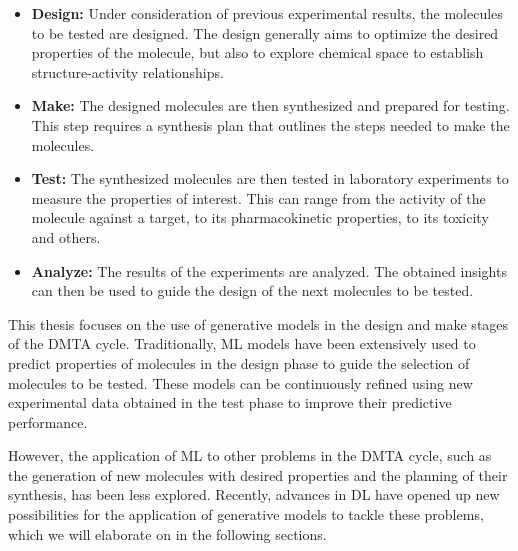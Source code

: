 \begin{itemize}
    \item \textbf{Design:} Under consideration of previous experimental results, the molecules to
          be tested are designed. The design generally aims to optimize the desired properties of
          the molecule, but also to explore chemical space to establish structure-activity relationships.
    \item \textbf{Make:} The designed molecules are then synthesized and prepared for testing. This
          step requires a synthesis plan that outlines the steps needed to make the molecules.
    \item \textbf{Test:} The synthesized molecules are then tested in laboratory experiments to
          measure the properties of interest. This can range from the activity of the molecule
          against a target, to its pharmacokinetic properties, to its toxicity and others.
    \item \textbf{Analyze:} The results of the experiments are analyzed. The obtained insights
          can then be used to guide the design of the next molecules to be tested.
\end{itemize}

This thesis focuses on the use of generative models in the design and make stages of the \ac{DMTA}
cycle. Traditionally, \ac{ML} models have been extensively used to predict properties of molecules
in the design phase to guide the selection of molecules to be tested. These models can be
continuously refined using new experimental data obtained in the test phase to improve their
predictive performance.

However, the application of \ac{ML} to other problems in the \ac{DMTA} cycle, such as the generation
of new molecules with desired properties and the planning of their synthesis, has been less
explored. Recently, advances in \ac{DL} have opened up new possibilities for the application of
generative models to tackle these problems, which we will elaborate on in the following sections.

